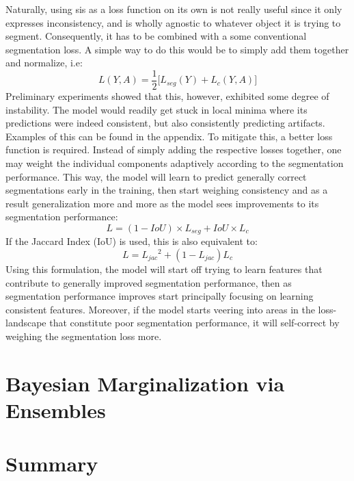     Naturally, using \gls{sis} as a loss function on its own is not really useful since it only expresses inconsistency, and is wholly agnostic to whatever object it is trying to segment. Consequently, it has to be combined with a some conventional segmentation loss. A simple way to do this would be to simply add them together and normalize, i.e:
\begin{equation*}
    L(Y, A) = \frac{1}{2} \big[L_{seg}(Y)+L_c(Y,A)\big]
\end{equation*}
Preliminary experiments showed that this, however, exhibited some degree of instability. The model would readily get stuck in local minima where its predictions were indeed consistent, but also consistently predicting artifacts. Examples of this can be found in the appendix. To mitigate this, a better loss function is required. Instead of simply adding the respective losses together, one may weight the individual components adaptively according to the segmentation performance. This way, the model will learn to predict generally correct segmentations early in the training, then start weighing consistency and as a result generalization more and more as the model sees improvements to its segmentation performance:
    \begin{equation}
        L = (1-IoU)\times L_{seg} + IoU \times L_c
    \end{equation}
        If the Jaccard Index (IoU) is used, this is also equivalent to:
    \begin{equation}
        L = {L_{jac}}^2 + (1-L_{jac})L_c
    \end{equation}
Using this formulation, the model will start off trying to learn features that contribute to generally improved segmentation performance, then as segmentation performance improves start principally focusing on learning consistent features. Moreover, if the model starts veering into areas in the loss-landscape that constitute poor segmentation performance, it will self-correct by weighing the segmentation loss more. 

\section{Bayesian Marginalization via Ensembles}

\section{Summary}